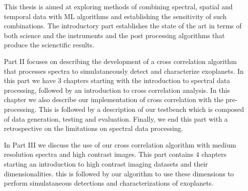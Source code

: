 This thesis is aimed at exploring methods of combining spectral, spatial and temporal data with ML algorithms and establishing the sensitivity 
of such combinations. 
The introductory part establishes the state of the art in terms of both science and the instruments and the post processing algorithms that produce the scienctific results.

Part II focuses on describing the development of a cross correlation algorithm that processes spectra to simulataneously\@
detect and characterize exoplanets.
In this part we have $3$ chapters starting with the introduction to spectral data processing, followed by an introduction
to cross correlation analysis. 
In this chapter we also describe our implementation of cross correlation with the pre-processing.
This is followed by a description of our testbench which is composed of data generation, testing and evaluation.
Finally, we end this part with a retrospective on the limitations on spectral data processing. 

In Part III we discuss the use of our cross correlation algorithm with medium resolution spectra and high contrast images.
This part contains $4$ chapters starting an introduction to high contrast imaging datasets and their dimensionalities.
this is followed by our algorithm to use these dimensions to perform simulataneous detections and characterizations of exoplanets.

